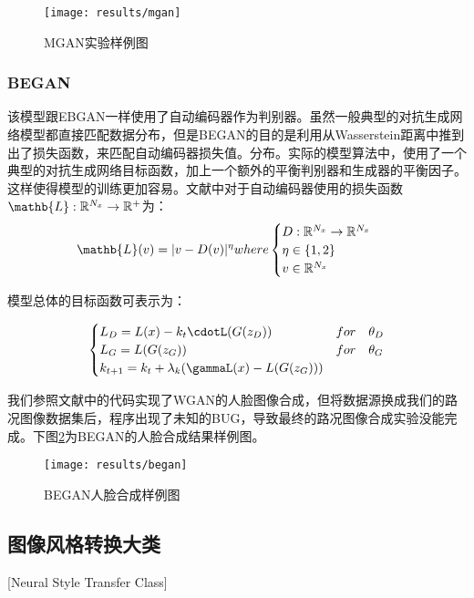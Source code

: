 \begin{figure}[h] 
    \centering
    \texttt{[image: results/mgan]}
    \caption{MGAN实验样例图}
    \label{fig:mag}
\end{figure}

\subsubsection{BEGAN}

  该模型跟EBGAN\cite{ebgan}一样使用了自动编码器作为判别器。虽然一般典型的对抗生成网络模型都直接匹配数据分布，但是BEGAN的目的是利用从Wasserstein距离中推到出了损失函数，来匹配自动编码器损失值。分布。实际的模型算法中，使用了一个典型的对抗生成网络目标函数，加上一个额外的平衡判别器和生成器的平衡因子。这样使得模型的训练更加容易。文献\cite{BEGAN}中对于自动编码器使用的损失函数$\mathb{L}:\mathbb{R}^{N_x}\to \mathbb{R}^+$为：
\begin{align}
    \mathb{L}(v) = |v-D(v)|^\eta where \begin{cases}
        D: \mathbb{R}^{N_x}\to \mathbb{R}^{N_x} \quad  \\
        \eta \in \{1,2\} \quad  \\
        v \in \mathbb{R}^{N_x} 
    \end{cases}
\end{align}

模型总体的目标函数可表示为：

\begin{align}
    \begin{cases}
        L_D = L(x) - k_t\cdotL(G(z_D)) & for \quad \theta_D \\
        L_G = L(G(z_G)) & for \quad \theta_G \\
        k_{t+1} = k_t + \lambda_k(\gammaL(x)-L(G(z_G))) 
    \end{cases}  
\end{align}

我们参照文献中的代码实现了WGAN的人脸图像合成，但将数据源换成我们的路况图像数据集后，程序出现了未知的BUG，导致最终的路况图像合成实验没能完成。下图\ref{fig:began}为BEGAN的人脸合成结果样例图。

\begin{figure}[h]
    \centering
    \texttt{[image: results/began]}
    \caption{BEGAN人脸合成样例图}
    \label{fig:began}
\end{figure}


\subsection{图像风格转换大类}[Neural Style Transfer Class]

